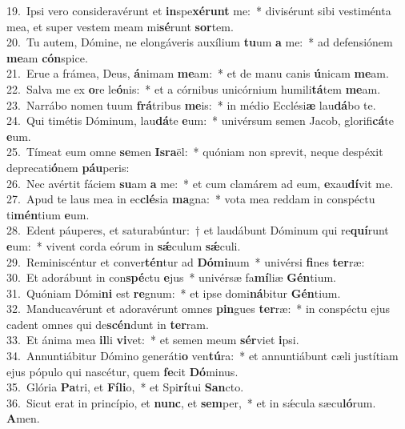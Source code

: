 {19.~}Ipsi vero consideravérunt et \textbf{in}spe\textbf{xé}\textbf{runt} me:~* divisérunt sibi vestiménta mea, et super vestem meam mi\textbf{sé}runt \textbf{sor}tem.\\
{20.~}Tu autem, Dómine, ne elongáveris auxílium \textbf{tu}um \textbf{a} me:~* ad defensiónem \textbf{me}am \textbf{cón}spice.\\
{21.~}Erue a frámea, Deus, \textbf{á}nimam \textbf{me}am:~* et de manu canis \textbf{ú}nicam \textbf{me}am.\\
{22.~}Salva me ex \textbf{o}re le\textbf{ó}nis:~* et a córnibus unicórnium humili\textbf{tá}tem \textbf{me}am.\\
{23.~}Narrábo nomen tuum \textbf{frá}tribus \textbf{me}is:~* in médio Ecclési\textbf{æ} lau\textbf{dá}bo te.\\
{24.~}Qui timétis Dóminum, lau\textbf{dá}te \textbf{e}um:~* univérsum semen Jacob, glorifi\textbf{cá}te \textbf{e}um.\\
{25.~}Tímeat eum omne \textbf{se}men \textbf{Is}\textbf{ra}ël:~* quóniam non sprevit, neque despéxit deprecati\textbf{ó}nem \textbf{páu}peris:\\
{26.~}Nec avértit fáciem \textbf{su}am \textbf{a} me:~* et cum clamárem ad eum, \textbf{e}xau\textbf{dí}vit me.\\
{27.~}Apud te laus mea in ec\textbf{clé}sia \textbf{ma}gna:~* vota mea reddam in conspéctu ti\textbf{mén}tium \textbf{e}um.\\
{28.~}Edent páuperes, et saturabúntur:~† et laudábunt Dóminum qui re\textbf{quí}runt \textbf{e}um:~* vivent corda eórum in \textbf{sǽ}culum \textbf{sǽ}culi.\\
{29.~}Reminiscéntur et conver\textbf{tén}tur ad \textbf{Dó}\textbf{mi}num~* univérsi \textbf{fi}nes \textbf{ter}ræ:\\
{30.~}Et adorábunt in con\textbf{spé}ctu \textbf{e}jus~* univérsæ fa\textbf{mí}liæ \textbf{Gén}tium.\\
{31.~}Quóniam Dómi\textbf{ni} est \textbf{re}gnum:~* et ipse domi\textbf{ná}bitur \textbf{Gén}tium.\\
{32.~}Manducavérunt et adoravérunt omnes \textbf{pin}gues \textbf{ter}ræ:~* in conspéctu ejus cadent omnes qui de\textbf{scén}dunt in \textbf{ter}ram.\\
{33.~}Et ánima mea \textbf{il}li \textbf{vi}vet:~* et semen meum \textbf{sér}viet \textbf{i}psi.\\
{34.~}Annuntiábitur Dómino generáti\textbf{o} ven\textbf{tú}ra:~* et annuntiábunt cæli justítiam ejus pópulo qui nascétur, quem \textbf{fe}cit \textbf{Dó}minus.\\
{35.~}Glória \textbf{Pa}tri, et \textbf{Fí}\textbf{li}o,~* et Spi\textbf{rí}tui \textbf{San}cto.\\
{36.~}Sicut erat in princípio, et \textbf{nunc}, et \textbf{sem}per,~* et in sǽcula sæcu\textbf{ló}rum. \textbf{A}men.\\
